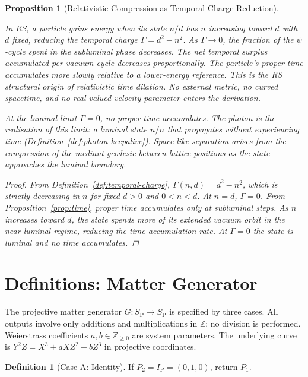 \documentclass[11pt, letterpaper]{article}
\newcommand{\Z}{\mathbb{Z}}
\newcommand{\SP}{S_{\mathrm{P}}}
\newcommand{\IP}{I_{\mathrm{P}}}
\newcommand{\Tcharge}{\Gamma}
\theoremstyle{definition}
\newtheorem{definition}{Definition}[section]
\theoremstyle{plain}
\newtheorem{proposition}{Proposition}[section]
\begin{document}
\begin{proposition}[Relativistic Compression as Temporal Charge Reduction]\label{prop:relcomp}
\begin{rsbox}
In RS, a particle gains energy when its state $n/d$ has $n$ increasing toward $d$
with $d$ fixed, reducing the temporal charge $\Tcharge = d^2 - n^2$.  As
$\Tcharge \to 0$, the fraction of the $\psi$-cycle spent in the subluminal phase
decreases.  The net temporal surplus accumulated per vacuum cycle decreases
proportionally.  The particle's proper time accumulates more slowly relative to a
lower-energy reference.  This is the RS structural origin of relativistic time
dilation.  No external metric, no curved spacetime, and no real-valued velocity
parameter enters the derivation.

At the luminal limit $\Tcharge = 0$, no proper time accumulates.  The photon is
the realisation of this limit: a luminal state $n/n$ that propagates without
experiencing time (Definition~\ref{def:photon-keepalive}).  Space-like separation
arises from the compression of the mediant geodesic between lattice positions as
the state approaches the luminal boundary.
\end{rsbox}
\begin{proof}
From Definition~\ref{def:temporal-charge}, $\Tcharge(n,d) = d^2 - n^2$, which
is strictly decreasing in $n$ for fixed $d > 0$ and $0 < n < d$.  At $n = d$,
$\Tcharge = 0$.  From Proposition~\ref{prop:time}, proper time accumulates only
at subluminal steps.  As $n$ increases toward $d$, the state spends more of its
extended vacuum orbit in the near-luminal regime, reducing the time-accumulation
rate.  At $\Tcharge = 0$ the state is luminal and no time accumulates.
\end{proof}
\end{proposition}

\newpage


\section{Definitions: Matter Generator}\label{sec:mattergenerator}

The projective matter generator $G:\SP\to\SP$ is specified by three cases.
All outputs involve only additions and multiplications in $\Z$; no division is
performed.  Weierstrass coefficients $a,b\in\Z_{\geq 0}$ are system
parameters.  The underlying curve is $Y^2Z=X^3+aXZ^2+bZ^3$ in projective
coordinates.

\begin{definition}[Case A: Identity]\label{def:caseA}
If $P_2=\IP=(0,1,0)$, return $P_1$.
\end{definition}
\end{document}
